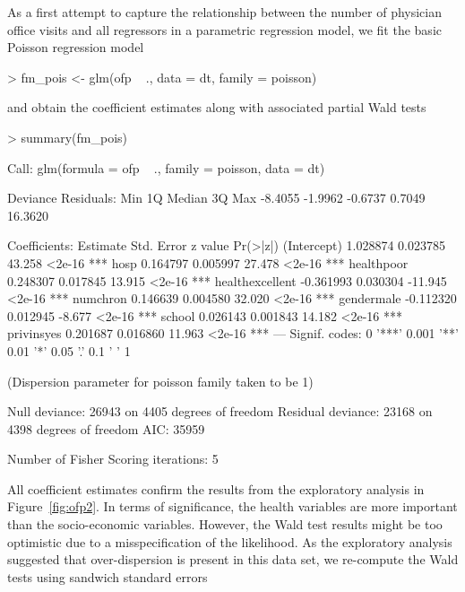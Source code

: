 \documentclass{Z}
\begin{document}
As a first attempt to capture the relationship between the number of 
physician office visits and all regressors  in a parametric
regression model, we fit the basic Poisson regression model
\begin{Schunk}
\begin{Sinput}
> fm_pois <- glm(ofp ~ ., data = dt, family = poisson)
\end{Sinput}
\end{Schunk}
and obtain the coefficient estimates along with associated partial Wald tests
\begin{Schunk}
\begin{Sinput}
> summary(fm_pois)
\end{Sinput}
\begin{Soutput}
Call:
glm(formula = ofp ~ ., family = poisson, data = dt)

Deviance Residuals: 
    Min       1Q   Median       3Q      Max  
-8.4055  -1.9962  -0.6737   0.7049  16.3620  

Coefficients:
                 Estimate Std. Error z value Pr(>|z|)    
(Intercept)      1.028874   0.023785  43.258   <2e-16 ***
hosp             0.164797   0.005997  27.478   <2e-16 ***
healthpoor       0.248307   0.017845  13.915   <2e-16 ***
healthexcellent -0.361993   0.030304 -11.945   <2e-16 ***
numchron         0.146639   0.004580  32.020   <2e-16 ***
gendermale      -0.112320   0.012945  -8.677   <2e-16 ***
school           0.026143   0.001843  14.182   <2e-16 ***
privinsyes       0.201687   0.016860  11.963   <2e-16 ***
---
Signif. codes:  0 '***' 0.001 '**' 0.01 '*' 0.05 '.' 0.1 ' ' 1 

(Dispersion parameter for poisson family taken to be 1)

    Null deviance: 26943  on 4405  degrees of freedom
Residual deviance: 23168  on 4398  degrees of freedom
AIC: 35959

Number of Fisher Scoring iterations: 5
\end{Soutput}
\end{Schunk}
All coefficient estimates confirm the results from the exploratory analysis
in Figure~\ref{fig:ofp2}. In terms of significance, the health variables are
more important than the socio-economic variables. However, the Wald test
results might be too optimistic due to a misspecification of the likelihood.
As the exploratory analysis suggested that over-dispersion is present in this data
set, we re-compute the Wald tests using sandwich standard errors
\end{document}
